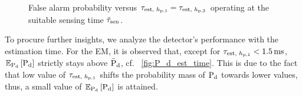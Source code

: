 \begin{figure}[!t]

\centering
{}
\caption{False alarm probability versus $\tau_{\text{est, $h_{\text{p,1}}$}} = \tau_{\text{est, $h_{\text{p,3}}$}}$ operating at the suitable sensing time $\tilde{\tau}_{\text{sen}}$.}
\label{fig:P_f_est_time}
\end{figure}
To procure further insights, we analyze the detector's performance with the estimation time. For the EM, it is observed that, except for $\tau_{\text{est, $h_{\text{p,1}}$}} < \SI{1.5}{ms}$, ${\mathbb E}_{\text{P}_{\text{d}}}\left[ \text{P}_{\text{d}} \right]$ strictly stays above $\bar{\text{P}}_{\text{d}}$, cf. \figurename~\ref{fig:P_d_est_time}. This is due to the fact that low value of $\tau_{\text{est, $h_{\text{p,1}}$}}$ shifts the probability mass of $\text{P}_{\text{d}}$ towards lower values, thus, a small value of ${\mathbb E}_{\text{P}_{\text{d}}}\left[ \text{P}_{\text{d}} \right]$ is attained. %

